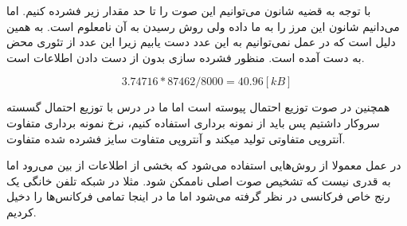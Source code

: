 {با توجه به قضیه شانون می‌توانیم این صوت را تا حد مقدار زیر فشرده کنیم. اما می‌دانیم شانون این مرز را به ما داده ولی روش رسیدن به آن نامعلوم است. به همین دلیل است که در عمل نمی‌توانیم به این عدد دست یابیم زیرا این عدد از تئوری محض به دست آمده است. منظور فشرده سازی بدون از دست دادن اطلاعات است.

\begin{equation*}
    3.74716 * 87462 / 8000 = 40.96 [kB]
\end{equation*}

همچنین در صوت توزیع احتمال پیوسته است اما ما در درس با توزیع احتمال گسسته سروکار داشتیم پس باید از نمونه برداری استفاده کنیم، نرخ نمونه برداری متفاوت آنتروپی متفاوتی تولید میکند و آنتروپی متفاوت سایز فشرده شده متفاوت.

در عمل معمولا از روش‌هایی استفاده می‌شود که بخشی از اطلاعات از بین می‌رود اما به قدری نیست که تشخیص صوت اصلی ناممکن شود. مثلا در شبکه تلفن خانگی یک رنج خاص فرکانسی در نظر گرفته می‌شود اما ما در اینجا تمامی فرکانس‌ها را دخیل کردیم.

}
